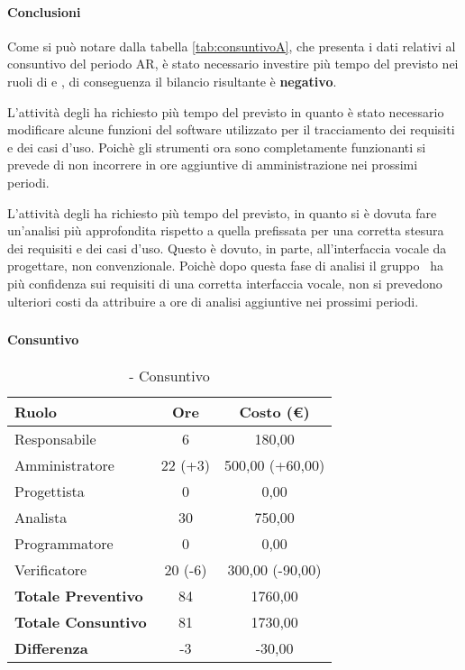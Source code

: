 \documentclass[./PianoDiProgetto.tex]{subfiles}
\begin{document}
  \paragraph{Conclusioni}
		Come si può notare dalla tabella \ref{tab:consuntivoA}, che presenta i dati relativi al consuntivo del periodo AR, è stato necessario investire più tempo del previsto nei ruoli di  \AMM{} e \AN, di conseguenza il bilancio risultante è \textbf{negativo}.

		L'attività degli \AMMP{} ha richiesto più tempo del previsto in quanto è stato necessario modificare alcune funzioni del software utilizzato per il tracciamento dei requisiti e dei casi d'uso. Poichè gli strumenti ora sono completamente funzionanti si prevede di non incorrere in ore aggiuntive di amministrazione nei prossimi periodi.

		L'attività degli \ANP{} ha richiesto più tempo del previsto, in quanto si è dovuta fare un'analisi più approfondita rispetto a quella prefissata per una corretta stesura dei requisiti e dei casi d'uso.
		Questo è dovuto, in parte, all'interfaccia vocale da progettare, non convenzionale.
		Poichè dopo questa fase di analisi il gruppo \GRUPPO\ ha più confidenza sui requisiti di una corretta interfaccia vocale, non si prevedono ulteriori costi da attribuire a ore di analisi aggiuntive nei prossimi periodi.

\subsubsection{\PerAD}
	\paragraph{Consuntivo}
	\begin{table}[h]
		\centering
		\begin{tabular}{l * {2}{c}}
			\toprule
			\textbf{Ruolo} & \textbf{Ore} & \textbf{Costo (\euro{})} \\
			\midrule
			Responsabile &	6 & 180,00 \\
			Amministratore & 22 (+3)  & 500,00 (+60,00)\\
			Progettista & 0 & 0,00 \\
			Analista & 30 & 750,00\\
			Programmatore & 0 & 0,00 \\
			Verificatore & 20 (-6) & 300,00 (-90,00)\\
			\midrule
			\textbf{Totale Preventivo} & 84
 & 1760,00
 \\
			\textbf{Totale Consuntivo} & 81 & 1730,00 \\
			\midrule
			\textbf{Differenza} & -3 & -30,00 \\
			\bottomrule
		\end{tabular}
		\caption{\PerAD{} - Consuntivo}

	\end{table}
\end{document}
